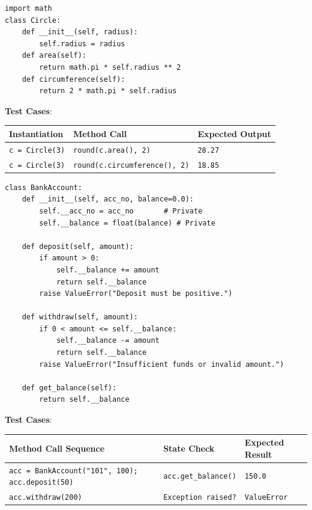 \begin{solutionbox}
\begin{lstlisting}[language=Python3]
import math
class Circle:
    def __init__(self, radius):
        self.radius = radius
    def area(self):
        return math.pi * self.radius ** 2
    def circumference(self):
        return 2 * math.pi * self.radius
\end{lstlisting}
\textbf{Test Cases}:
\begin{tabular}{|l|l|l|}
\hline
\textbf{Instantiation} & \textbf{Method Call} & \textbf{Expected Output} \\ \hline
\texttt{c = Circle(3)} & \texttt{round(c.area(), 2)} & \texttt{28.27} \\ \hline
\texttt{c = Circle(3)} & \texttt{round(c.circumference(), 2)} & \texttt{18.85} \\ \hline
\end{tabular}
\end{solutionbox}

\begin{solutionbox}
\begin{lstlisting}[language=Python3]
class BankAccount:
    def __init__(self, acc_no, balance=0.0):
        self.__acc_no = acc_no       # Private
        self.__balance = float(balance) # Private
        
    def deposit(self, amount):
        if amount > 0:
            self.__balance += amount
            return self.__balance
        raise ValueError("Deposit must be positive.")
        
    def withdraw(self, amount):
        if 0 < amount <= self.__balance:
            self.__balance -= amount
            return self.__balance
        raise ValueError("Insufficient funds or invalid amount.")
        
    def get_balance(self):
        return self.__balance
\end{lstlisting}
\textbf{Test Cases}:
\begin{tabular}{|l|l|l|}
\hline
\textbf{Method Call Sequence} & \textbf{State Check} & \textbf{Expected Result} \\ \hline
\texttt{acc = BankAccount("101", 100); acc.deposit(50)} & \texttt{acc.get\_balance()} & \texttt{150.0} \\ \hline
\texttt{acc.withdraw(200)} & \texttt{Exception raised?} & \texttt{ValueError} \\ \hline
\end{tabular}
\end{solutionbox}

